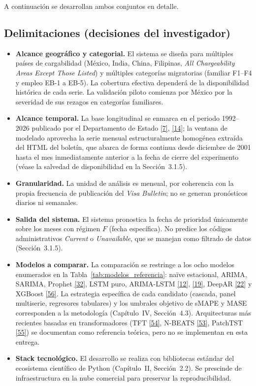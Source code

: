 \documentclass[12pt,letterpaper]{report}
\newcommand{\cita}[1]{\hyperref[bib:#1]{[#1]}}
\begin{document}
A continuación se desarrollan ambos conjuntos en detalle.

\subsection*{Delimitaciones (decisiones del investigador)}

\begin{itemize}[leftmargin=1.4cm, itemsep=2pt, topsep=2pt]
    \item \textbf{Alcance geográfico y categorial.} El sistema se diseña para múltiples países de cargabilidad (México, India, China, Filipinas, \textit{All Chargeability Areas Except Those Listed}) y múltiples categorías migratorias (familiar F1--F4 y empleo EB-1 a EB-5). La cobertura efectiva dependerá de la disponibilidad histórica de cada serie. La validación piloto comienza por México por la severidad de sus rezagos en categorías familiares.
    \item \textbf{Alcance temporal.} La base longitudinal se enmarca en el periodo 1992--2026 publicado por el Departamento de Estado \cita{7}, \cita{14}; la ventana de modelado aprovecha la serie mensual estructuralmente homogénea extraída del HTML del boletín, que abarca de forma continua desde diciembre de 2001 hasta el mes inmediatamente anterior a la fecha de cierre del experimento (véase la salvedad de disponibilidad en la Sección~3.1.5).
    \item \textbf{Granularidad.} La unidad de análisis es mensual, por coherencia con la propia frecuencia de publicación del \textit{Visa Bulletin}; no se generan pronósticos diarios ni semanales.
    \item \textbf{Salida del sistema.} El sistema pronostica la fecha de prioridad únicamente sobre los meses con régimen $F$ (fecha específica). No predice los códigos administrativos \textit{Current} o \textit{Unavailable}, que se manejan como filtrado de datos (Sección~3.1.5).
    \item \textbf{Modelos a comparar.} La comparación se restringe a los ocho modelos enumerados en la Tabla~\ref{tab:modelos_referencia}: naïve estacional, ARIMA, SARIMA, Prophet \cita{32}, LSTM puro, ARIMA-LSTM \cita{12}, \cita{19}, DeepAR \cita{22} y XGBoost \cita{56}. La estrategia específica de cada candidato (cascada, panel multiserie, regresores tabulares) y los umbrales objetivo de sMAPE y MASE corresponden a la metodología (Capítulo~IV, Sección~4.3). Arquitecturas más recientes basadas en transformadores (TFT \cita{54}, N-BEATS \cita{53}, PatchTST \cita{55}) se documentan como referencia teórica, pero no se implementan en esta entrega.
    \item \textbf{Stack tecnológico.} El desarrollo se realiza con bibliotecas estándar del ecosistema científico de Python (Capítulo~II, Sección~2.2). Se prescinde de infraestructura en la nube comercial para preservar la reproducibilidad.
\end{itemize}
\end{document}
